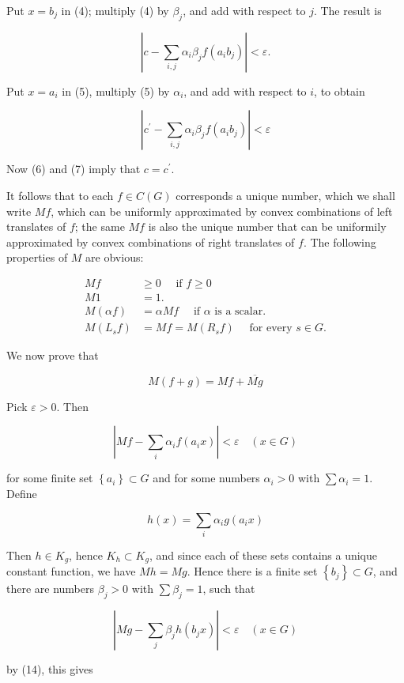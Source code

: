\documentclass[10pt]{article}
\begin{document}
Put $x=b_{j}$ in (4); multiply (4) by $\beta_{j}$, and add with respect to $j$. The result is

$$
\left|c-\sum_{i, j} \alpha_{i} \beta_{j} f\left(a_{i} b_{j}\right)\right|<\varepsilon .
$$

Put $x=a_{i}$ in (5), multiply (5) by $\alpha_{i}$, and add with respect to $i$, to obtain

$$
\left|c^{\prime}-\sum_{i, j} \alpha_{i} \beta_{j} f\left(a_{i} b_{j}\right)\right|<\varepsilon
$$

Now (6) and (7) imply that $c=c^{\prime}$.

It follows that to each $f \in C(G)$ corresponds a unique number, which we shall write $M f$, which can be uniformly approximated by convex combinations of left translates of $f$; the same $M f$ is also the unique number that can be uniformily approximated by convex combinations of right translates of $f$. The following properties of $M$ are obvious:

$$
\begin{aligned}
M f & \geq 0 \quad \text { if } f \geq 0 \\
M 1 & =1 . \\
M(\alpha f) & =\alpha M f \quad \text { if } \alpha \text { is a scalar. } \\
M\left(L_{s} f\right) & =M f=M\left(R_{s} f\right) \quad \text { for every } s \in G .
\end{aligned}
$$

We now prove that

$$
M(f+g)=M f+\overline{M g}
$$

Pick $\varepsilon>0$. Then

$$
\left|M f-\sum_{i} \alpha_{i} f\left(a_{i} x\right)\right|<\varepsilon \quad(x \in G)
$$

for some finite set $\left\{a_{i}\right\} \subset G$ and for some numbers $\alpha_{i}>0$ with $\sum \alpha_{i}=1$. Define

$$
h(x)=\sum_{i} \alpha_{i} g\left(a_{i} x\right)
$$

Then $h \in K_{g}$, hence $K_{h} \subset K_{g}$, and since each of these sets contains a unique constant function, we have $M h=M g$. Hence there is a finite set $\left\{b_{j}\right\} \subset G$, and there are numbers $\beta_{j}>0$ with $\sum \beta_{j}=1$, such that

$$
\left|M g-\sum_{j} \beta_{j} h\left(b_{j} x\right)\right|<\varepsilon \quad(x \in G)
$$

by (14), this gives
\end{document}
